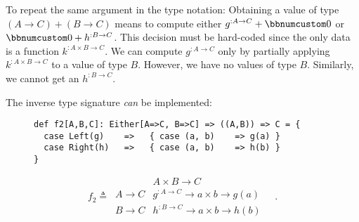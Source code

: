 To repeat the same argument in the type notation: Obtaining a value
of type $(A\rightarrow C)+(B\rightarrow C)$ means to compute either
$g^{:A\rightarrow C}+\bbnum 0$ or $\bbnum 0+h^{:B\rightarrow C}$.
This decision must be hard-coded since the only data is a function
$k^{:A\times B\rightarrow C}$. We can compute $g^{:A\rightarrow C}$
only by partially applying $k^{:A\times B\rightarrow C}$ to a value
of type $B$. However, we have no values of type $B$. Similarly,
we cannot get an $h^{:B\rightarrow C}$.

The inverse type signature \emph{can} be implemented:

\begin{wrapfigure}{l}{0.55\columnwidth}%
\vspace{0.32\baselineskip}
\begin{lstlisting}
def f2[A,B,C]: Either[A=>C, B=>C] => ((A,B)) => C = {
  case Left(g)    =>   { case (a, b)    => g(a) }
  case Right(h)   =>   { case (a, b)    => h(b) }
}
\end{lstlisting}

\vspace{-2.4\baselineskip}
\end{wrapfigure}%
\vspace{-1.2\baselineskip}

\noindent 
\[
f_{2}\triangleq\,\begin{array}{|c||c|}
 & A\times B\rightarrow C\\
\hline A\rightarrow C & g^{:A\rightarrow C}\rightarrow a\times b\rightarrow g(a)\\
B\rightarrow C & h^{:B\rightarrow C}\rightarrow a\times b\rightarrow h(b)
\end{array}\quad.
\]
\vspace{-0.9\baselineskip}

